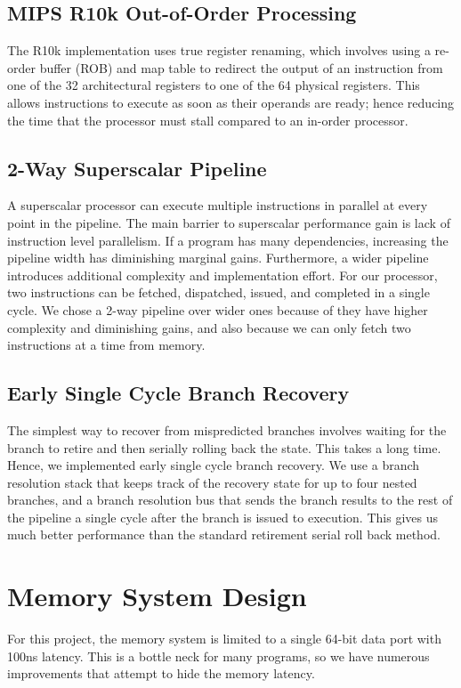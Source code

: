 \documentclass[10pt,journal,compsoc]{IEEEtran}
\begin{document}
\subsection{MIPS R10k Out-of-Order Processing}
The R10k implementation uses true register renaming, which involves using a re-order buffer (ROB) and map table to redirect the output of an instruction from one of the 32 architectural registers to one of the 64 physical registers. This allows instructions to execute as soon as their operands are ready; hence reducing the time that the processor must stall compared to an in-order processor.

\subsection{2-Way Superscalar Pipeline}
A superscalar processor can execute multiple instructions in parallel at every point in the pipeline. The main barrier to superscalar performance gain is lack of instruction level parallelism. If a program has many dependencies, increasing the pipeline width has diminishing marginal gains. Furthermore, a wider pipeline introduces additional complexity and implementation effort. For our processor, two instructions can be fetched, dispatched, issued, and completed in a single cycle. We chose a 2-way pipeline over wider ones because of they have higher complexity and diminishing gains, and also because we can only fetch two instructions at a time from memory.

\subsection{Early Single Cycle Branch Recovery}
The simplest way to recover from mispredicted branches involves waiting for the branch to retire and then serially rolling back the state. This takes a long time. Hence, we implemented early single cycle branch recovery. We use a branch resolution stack that keeps track of the recovery state for up to four nested branches, and a branch resolution bus that sends the branch results to the rest of the pipeline a single cycle after the branch is issued to execution. This gives us much better performance than the standard retirement serial roll back method.

\section{Memory System Design}
For this project, the memory system is limited to a single 64-bit data port with 100ns latency. This is a bottle neck for many programs, so we have numerous improvements that attempt to hide the memory latency.
\end{document}
